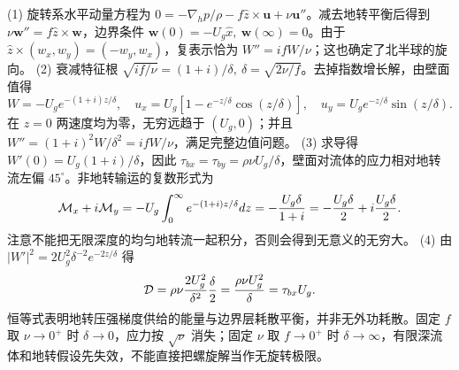 (1) 旋转系水平动量方程为 \(0=-\nabla_hp/\rho-f\hat z\times\boldsymbol u+\nu\boldsymbol u''\)。减去地转平衡后得到 \(\nu\boldsymbol w''=f\hat z\times\boldsymbol w\)，边界条件 \(\boldsymbol w(0)=-U_g\hat x,\ \boldsymbol w(\infty)=0\)。由于 \(\hat z\times(w_x,w_y)=(-w_y,w_x)\)，复表示恰为 \(W''=ifW/\nu\)；这也确定了北半球的旋向。
(2) 衰减特征根 \(\sqrt{if/\nu}=(1+i)/\delta,\ \delta=\sqrt{2\nu/f}\)。去掉指数增长解，由壁面值得
\[
W=-U_g e^{-(1+i)z/\delta},\quad
u_x=U_g[1-e^{-z/\delta}\cos(z/\delta)],\quad
u_y=U_g e^{-z/\delta}\sin(z/\delta).
\]
在 \(z=0\) 两速度均为零，无穷远趋于 \((U_g,0)\)；并且 \(W''=(1+i)^2W/\delta^2=ifW/\nu\)，满足完整边值问题。
(3) 求导得 \(W'(0)=U_g(1+i)/\delta\)，因此 \(\tau_{bx}=\tau_{by}=\rho\nu U_g/\delta\)，壁面对流体的应力相对地转流左偏 \(45^\circ\)。非地转输运的复数形式为
\[
{\cal M}_x+i{\cal M}_y=-U_g\int_0^\infty e^{-(1+i)z/\delta}dz
=-\frac{U_g\delta}{1+i}
=-\frac{U_g\delta}{2}+i\frac{U_g\delta}{2}.
\]
注意不能把无限深度的均匀地转流一起积分，否则会得到无意义的无穷大。
(4) 由 \(|W'|^2=2U_g^2\delta^{-2}e^{-2z/\delta}\) 得
\[
{\cal D}=\rho\nu\frac{2U_g^2}{\delta^2}\frac{\delta}{2}
=\frac{\rho\nu U_g^2}{\delta}=\tau_{bx}U_g.
\]
恒等式表明地转压强梯度供给的能量与边界层耗散平衡，并非无外功耗散。固定 \(f\) 取 \(\nu\to0^+\) 时 \(\delta\to0\)，应力按 \(\sqrt\nu\) 消失；固定 \(\nu\) 取 \(f\to0^+\) 时 \(\delta\to\infty\)，有限深流体和地转假设先失效，不能直接把螺旋解当作无旋转极限。
